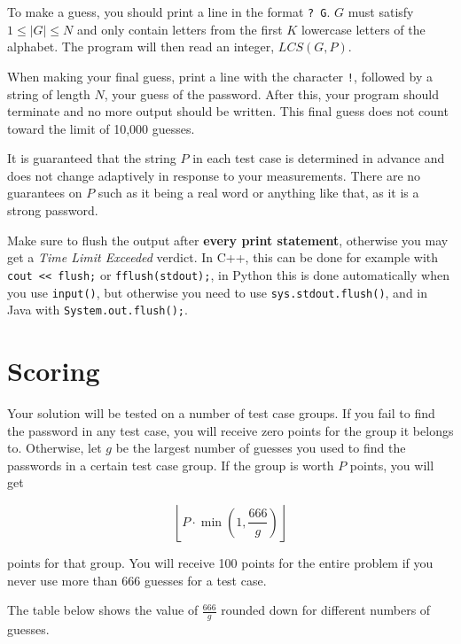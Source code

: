 To make a guess, you should print a line in the format \texttt{? G}. $G$ must satisfy $1 \le |G| \le N$
and only contain letters from the first $K$ lowercase letters of the alphabet.
The program will then read an integer, $LCS(G,P)$.

When making your final guess, print a line with the character \texttt{!}, followed by a string of length $N$,
your guess of the password. After this, your program should terminate and no more output should be written.
This final guess does not count toward the limit of 10,000 guesses.

It is guaranteed that the string $P$ in each test case is determined in advance and does not change adaptively
in response to your measurements.
There are no guarantees on $P$ such as it being a real word or anything like that, as it is a strong password. 

Make sure to flush the output after \textbf{every print statement}, otherwise you may get a
\textit{Time Limit Exceeded} verdict.
In C++, this can be done for example with \texttt{cout << flush;} or \texttt{fflush(stdout);},
in Python this is done automatically when you use \texttt{input()}, but otherwise you need to use
\texttt{sys.stdout.flush()},
and in Java with \texttt{System.out.flush();}.

\section*{Scoring}
Your solution will be tested on a number of test case groups. If you fail to
find the password in any test case, you will receive zero points for the group it belongs to. Otherwise, let
$g$ be the largest number of guesses you used to find the passwords in a certain test case group.
If the group is worth $P$ points, you will get

$$\left \lfloor{P \cdot \min(1, \frac{666}{g})}\right \rfloor $$

points for that group. You will receive 100 points for the entire problem if you never use more than $666$
guesses for a test case.

The table below shows the value of $\frac{666}{g}$ rounded down for different numbers of guesses.

